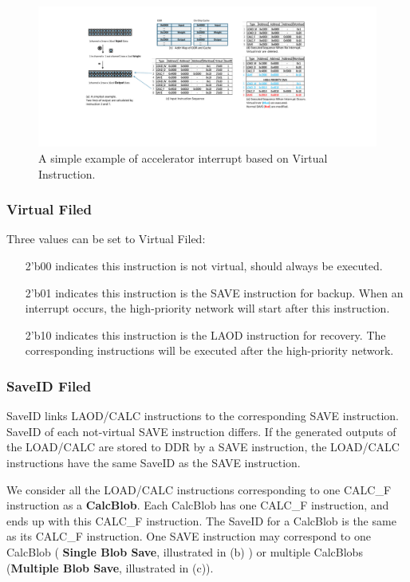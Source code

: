 \begin{figure}[t]
	\centering
	\includegraphics[width=0.95\linewidth]{fig/interexample.pdf}
	\caption{ A simple example of accelerator interrupt based on Virtual Instruction. }
	\label{fig:interexample}
\end{figure}

\subsubsection{ Virtual Filed}

Three values can be set to Virtual Filed:
\begin{itemize}
    \item[2'b00] indicates this instruction is not virtual, should always be executed.
    \item[2'b01] indicates this instruction is the SAVE instruction for backup. When an interrupt occurs, the high-priority network will start after this instruction.
    \item[2'b10] indicates this instruction is the LAOD instruction for recovery. The corresponding instructions will be executed after the high-priority network.
\end{itemize}

\subsubsection{ SaveID Filed }

SaveID links LAOD/CALC instructions to the corresponding SAVE instruction. SaveID of each not-virtual SAVE instruction differs. If the generated outputs of the LOAD/CALC are stored to DDR by a SAVE instruction, the LOAD/CALC instructions have the same SaveID as the SAVE instruction.

We consider all the LOAD/CALC instructions corresponding to one CALC\_F instruction as a \textbf{CalcBlob}. Each CalcBlob has one CALC\_F instruction, and ends up with this CALC\_F instruction. The SaveID for a CalcBlob is the same as its CALC\_F instruction.
One SAVE instruction may correspond to one CalcBlob ( \textbf{Single Blob Save}, illustrated in (b) ) or multiple CalcBlobs (\textbf{Multiple Blob Save}, illustrated in (c)).

